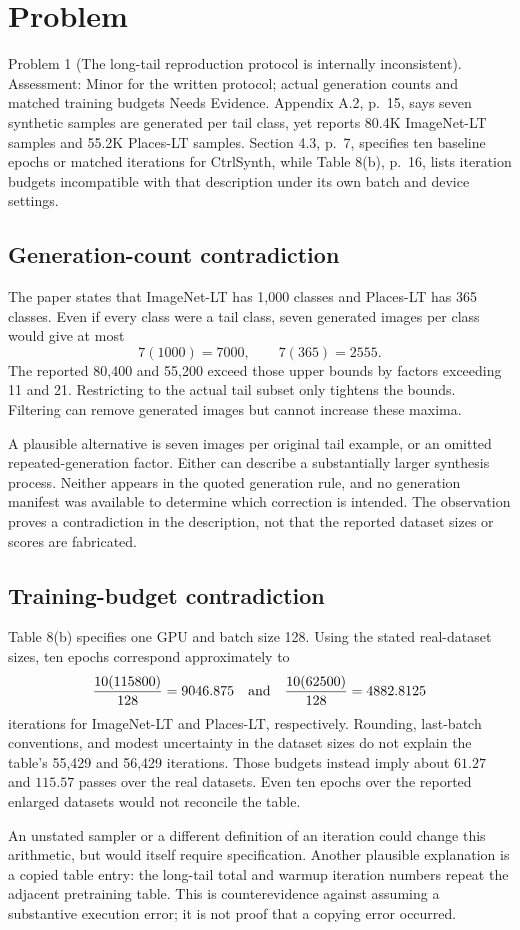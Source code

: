 \documentclass[10pt]{article}
\begin{document}
\section*{Problem}
Problem 1 (The long-tail reproduction protocol is internally inconsistent).  Assessment: Minor for the written protocol; actual generation counts and matched training budgets Needs Evidence. Appendix A.2, p. 15, says seven synthetic samples are generated per tail class, yet reports 80.4K ImageNet-LT samples and 55.2K Places-LT samples. Section 4.3, p. 7, specifies ten baseline epochs or matched iterations for CtrlSynth, while Table 8(b), p. 16, lists iteration budgets incompatible with that description under its own batch and device settings.\par
\subsection*{Generation-count contradiction}
The paper states that ImageNet-LT has 1,000 classes and Places-LT has 365 classes. Even if every class were a tail class, seven generated images per class would give at most \[7(1000)=7000,\qquad 7(365)=2555.\] The reported 80,400 and 55,200 exceed those upper bounds by factors exceeding 11 and 21. Restricting to the actual tail subset only tightens the bounds. Filtering can remove generated images but cannot increase these maxima.\par
A plausible alternative is seven images per original tail example, or an omitted repeated-generation factor. Either can describe a substantially larger synthesis process. Neither appears in the quoted generation rule, and no generation manifest was available to determine which correction is intended. The observation proves a contradiction in the description, not that the reported dataset sizes or scores are fabricated.\par
\subsection*{Training-budget contradiction}
Table 8(b) specifies one GPU and batch size 128. Using the stated real-dataset sizes, ten epochs correspond approximately to \[\frac{10(115800)}{128}=9046.875
 \quad\hbox{and}\quad
 \frac{10(62500)}{128}=4882.8125\] iterations for ImageNet-LT and Places-LT, respectively. Rounding, last-batch conventions, and modest uncertainty in the dataset sizes do not explain the table’s 55,429 and 56,429 iterations. Those budgets instead imply about \(61.27\) and \(115.57\) passes over the real datasets. Even ten epochs over the reported enlarged datasets would not reconcile the table.\par
An unstated sampler or a different definition of an iteration could change this arithmetic, but would itself require specification. Another plausible explanation is a copied table entry: the long-tail total and warmup iteration numbers repeat the adjacent pretraining table. This is counterevidence against assuming a substantive execution error; it is not proof that a copying error occurred.\par
\end{document}
